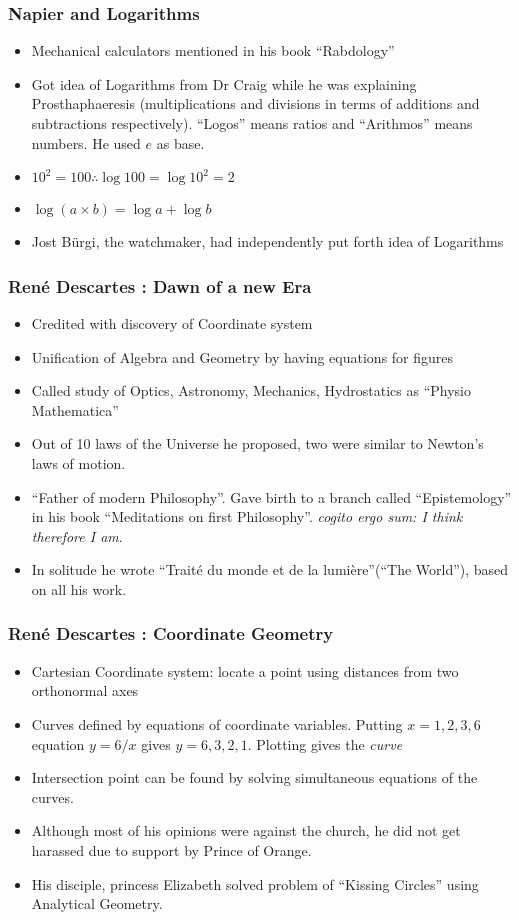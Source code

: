 \begin{frame}[fragile]
\frametitle{Napier and Logarithms}
\begin{itemize}[label=\textbullet, noitemsep,nolistsep]
\item Mechanical calculators mentioned in his book ``Rabdology''
\item Got idea of Logarithms from Dr Craig while he was explaining Prosthaphaeresis (multiplications and divisions in terms of additions and subtractions respectively). ``Logos'' means ratios and ``Arithmos'' means numbers. He used $e$ as base.
\item $10^2 = 100 \therefore \log 100 = \log 10^2 = 2$
\item $\log (a \times b) = \log a + \log b$
\item Jost B\"urgi, the watchmaker, had independently put forth idea of Logarithms
\end{itemize}
\end{frame}


\begin{frame}[fragile]
\frametitle{Ren\'e Descartes : Dawn of a new Era}
\begin{itemize}[label=\textbullet, noitemsep,nolistsep]
\item Credited with discovery of Coordinate system
\item Unification of Algebra and Geometry by  having equations for figures
\item Called study of Optics, Astronomy, Mechanics, Hydrostatics as ``Physio Mathematica''
\item Out of 10 laws of the Universe he proposed, two were similar to Newton's laws of motion.
\item ``Father of modern Philosophy''. Gave birth to a branch called ``Epistemology''  in his book ``Meditations on first Philosophy''. {\em cogito ergo sum: I think therefore I am}.
\item In solitude he wrote ``Trait\'e du monde et de la lumi\`ere''(``The World''), based on all his work.
\end{itemize}
\end{frame}


\begin{frame}[fragile]
\frametitle{Ren\'e Descartes : Coordinate Geometry}
\begin{itemize}[label=\textbullet, noitemsep,nolistsep]
\item Cartesian Coordinate system: locate a point using distances from two orthonormal axes
\item Curves defined by equations of coordinate variables. Putting $x=1,2,3,6$ equation $y=6/x$ gives $y=6,3,2,1$. Plotting gives the {\em curve}
\item Intersection point can be found by solving simultaneous equations of the curves.
\item Although most of his opinions were against the church, he did not get harassed due to support by Prince of Orange.
\item His disciple, princess Elizabeth solved problem of ``Kissing Circles'' using Analytical Geometry.
\end{itemize}
\end{frame}

